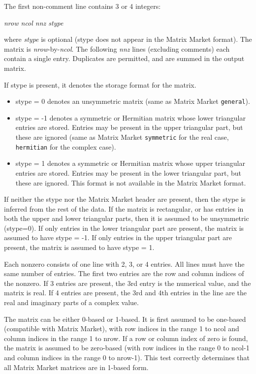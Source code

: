\documentclass[11pt]{article}
\begin{document}
The first non-comment line contains 3 or 4 integers:
\vspace{0.1in}

        {\em nrow ncol nnz stype}

\vspace{0.1in}
\noindent
where {\em stype} is optional (stype does not appear in the Matrix Market
format).  The matrix is {\em nrow}-by-{\em ncol}.  The following {\em nnz}
lines (excluding comments) each contain a single entry.  Duplicates are
permitted, and are summed in the output matrix.

If stype is present, it denotes the storage format for the matrix.
\begin{itemize}
\item stype = 0 denotes an unsymmetric matrix (same as Matrix Market {\tt general}).
\item stype = -1 denotes a symmetric or Hermitian matrix whose lower triangular
        entries are stored.  Entries may be present in the upper triangular
        part, but these are ignored (same as Matrix Market {\tt symmetric}
        for the real case, {\tt hermitian} for the complex case).
\item stype = 1 denotes a symmetric or Hermitian matrix whose upper triangular
        entries are stored.  Entries may be present in the lower triangular
        part, but these are ignored.  This format is not available in the Matrix
        Market format.
\end{itemize}

If neither the stype nor the Matrix Market header are present, then the stype
is inferred from the rest of the data.  If the matrix is rectangular, or has
entries in both the upper and lower triangular parts, then it is assumed to be
unsymmetric (stype=0).  If only entries in the lower triangular part are
present, the matrix is assumed to have stype = -1.  If only entries in the
upper triangular part are present, the matrix is assumed to have stype = 1.

Each nonzero consists of one line with 2, 3, or 4 entries.  All lines must have
the same number of entries.  The first two entries are the row and column
indices of the nonzero.  If 3 entries are present, the 3rd entry is the
numerical value, and the matrix is real.  If 4 entries are present, the 3rd and
4th entries in the line are the real and imaginary parts of a complex value.

The matrix can be either 0-based or 1-based.  It is first assumed to be
one-based (compatible with Matrix Market), with row indices in the range 1 to
ncol and column indices in the range 1 to nrow.  If a row or column index of
zero is found, the matrix is assumed to be zero-based (with row indices in the
range 0 to ncol-1 and column indices in the range 0 to nrow-1).  This test
correctly determines that all Matrix Market matrices are in 1-based form.
\end{document}
